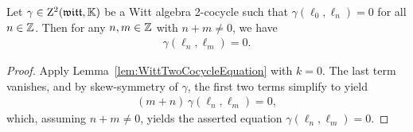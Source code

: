 \begin{lemma}
  \label{lem:WittTwoCocycleSupport}
  \leanok
  Let $\gamma \in \mathrm{Z}^2(\mathfrak{witt},\mathbb{K})$ be a Witt algebra 2-cocycle such that
  $\gamma (\ell_0 , \ell_n) = 0$ for all $n \in \mathbb{Z}$.
  Then for any $n,m \in \mathbb{Z}$ with $n+m \ne 0$, we have
  \begin{align*}
    \gamma(\ell_n , \ell_m) = 0.
  \end{align*}
\end{lemma}
\begin{proof}
  \leanok
  Apply Lemma~\ref{lem:WittTwoCocycleEquation} with $k=0$. The last term
  vanishes, and by skew-symmetry of $\gamma$, the first two terms simplify to yield
  \begin{align*}
    (m+n) \, \gamma (\ell_n , \ell_m) = 0 ,
  \end{align*}
  which, assuming $n+m \ne 0$, yields the asserted equation
  $\gamma (\ell_n , \ell_m) = 0$.
\end{proof}

